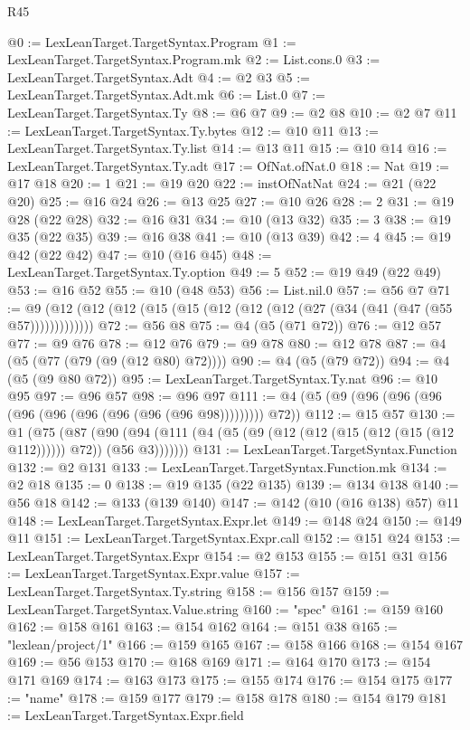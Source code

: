 \begin{lexlean}{R45}
\begin{coremodule}
@0 := LexLeanTarget.TargetSyntax.Program
@1 := LexLeanTarget.TargetSyntax.Program.mk
@2 := List.cons.{0}
@3 := LexLeanTarget.TargetSyntax.Adt
@4 := @2 @3
@5 := LexLeanTarget.TargetSyntax.Adt.mk
@6 := List.{0}
@7 := LexLeanTarget.TargetSyntax.Ty
@8 := @6 @7
@9 := @2 @8
@10 := @2 @7
@11 := LexLeanTarget.TargetSyntax.Ty.bytes
@12 := @10 @11
@13 := LexLeanTarget.TargetSyntax.Ty.list
@14 := @13 @11
@15 := @10 @14
@16 := LexLeanTarget.TargetSyntax.Ty.adt
@17 := OfNat.ofNat.{0}
@18 := Nat
@19 := @17 @18
@20 := 1
@21 := @19 @20
@22 := instOfNatNat
@24 := @21 (@22 @20)
@25 := @16 @24
@26 := @13 @25
@27 := @10 @26
@28 := 2
@31 := @19 @28 (@22 @28)
@32 := @16 @31
@34 := @10 (@13 @32)
@35 := 3
@38 := @19 @35 (@22 @35)
@39 := @16 @38
@41 := @10 (@13 @39)
@42 := 4
@45 := @19 @42 (@22 @42)
@47 := @10 (@16 @45)
@48 := LexLeanTarget.TargetSyntax.Ty.option
@49 := 5
@52 := @19 @49 (@22 @49)
@53 := @16 @52
@55 := @10 (@48 @53)
@56 := List.nil.{0}
@57 := @56 @7
@71 := @9 (@12 (@12 (@12 (@15 (@15 (@12 (@12 (@12 (@27 (@34 (@41 (@47 (@55 @57)))))))))))))
@72 := @56 @8
@75 := @4 (@5 (@71 @72))
@76 := @12 @57
@77 := @9 @76
@78 := @12 @76
@79 := @9 @78
@80 := @12 @78
@87 := @4 (@5 (@77 (@79 (@9 (@12 @80) @72))))
@90 := @4 (@5 (@79 @72))
@94 := @4 (@5 (@9 @80 @72))
@95 := LexLeanTarget.TargetSyntax.Ty.nat
@96 := @10 @95
@97 := @96 @57
@98 := @96 @97
@111 := @4 (@5 (@9 (@96 (@96 (@96 (@96 (@96 (@96 (@96 (@96 (@96 @98))))))))) @72))
@112 := @15 @57
@130 := @1
    (@75
      (@87 (@90 (@94 (@111 (@4 (@5 (@9 (@12 (@12 (@15 (@12 (@15 (@12 @112)))))) @72)) (@56 @3)))))))
@131 := LexLeanTarget.TargetSyntax.Function
@132 := @2 @131
@133 := LexLeanTarget.TargetSyntax.Function.mk
@134 := @2 @18
@135 := 0
@138 := @19 @135 (@22 @135)
@139 := @134 @138
@140 := @56 @18
@142 := @133 (@139 @140)
@147 := @142 (@10 (@16 @138) @57) @11
@148 := LexLeanTarget.TargetSyntax.Expr.let
@149 := @148 @24
@150 := @149 @11
@151 := LexLeanTarget.TargetSyntax.Expr.call
@152 := @151 @24
@153 := LexLeanTarget.TargetSyntax.Expr
@154 := @2 @153
@155 := @151 @31
@156 := LexLeanTarget.TargetSyntax.Expr.value
@157 := LexLeanTarget.TargetSyntax.Ty.string
@158 := @156 @157
@159 := LexLeanTarget.TargetSyntax.Value.string
@160 := "spec"
@161 := @159 @160
@162 := @158 @161
@163 := @154 @162
@164 := @151 @38
@165 := "lexlean/project/1"
@166 := @159 @165
@167 := @158 @166
@168 := @154 @167
@169 := @56 @153
@170 := @168 @169
@171 := @164 @170
@173 := @154 @171 @169
@174 := @163 @173
@175 := @155 @174
@176 := @154 @175
@177 := "name"
@178 := @159 @177
@179 := @158 @178
@180 := @154 @179
@181 := LexLeanTarget.TargetSyntax.Expr.field

\end{coremodule}
\end{lexlean}
